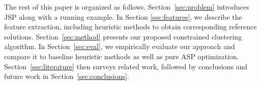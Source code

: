 \documentclass[runningheads]{llncs}
\begin{document}




The rest of this paper is organized as follows. Section~\ref{sec:problem} introduces JSP along with a running example. In Section \ref{sec:features}, we describe the feature extraction, including heuristic methods to obtain corresponding reference solutions. Section~\ref{sec:method} presents our proposed constrained clustering algorithm. In Section~\ref{sec:eval}, we empirically evaluate our approach and compare it to baseline heuristic methods as well as pure ASP optimization. Section~\ref{sec:literature} then surveys related work, followed by conclusions and future work in Section~\ref{sec:conclusions}.
\end{document}
